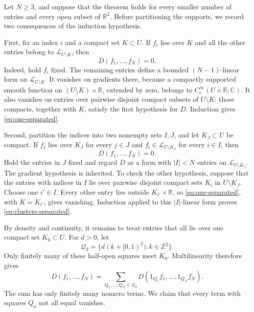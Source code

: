 \documentclass[11pt,letterpaper,reqno]{amsart}
\theoremstyle{definition}
\theoremstyle{remark}
\newcommand{\R}{\mathbb R}
\newcommand{\C}{\mathbb C}
\begin{document}
Let $N\ge3$, and suppose that the theorem holds for every smaller number
of entries and every open subset of $\R^2$. Before partitioning the
supports, we record two consequences of the induction hypothesis.

First, fix an index $i$ and a compact set $K\subset U$. If $f_i$ lies over
$K$ and all the other entries belong to $\mathcal L_{U\setminus K}$,
then
\begin{equation}\label{eq:one-separated}
 D(f_1,\ldots,f_N)=0.
\end{equation}
Indeed, hold $f_i$ fixed. The remaining entries define a bounded
$(N-1)$-linear form on $\mathcal L_{U\setminus K}$. It vanishes on
gradients there, because a compactly supported smooth function on
$(U\setminus K)\times\R$, extended by zero, belongs to
$C_c^\infty(U\times\R;\C)$.
It also vanishes on entries over pairwise disjoint compact subsets of
$U\setminus K$: those compacts, together with $K$, satisfy the first
hypothesis for $D$. Induction gives \eqref{eq:one-separated}.

Second, partition the indices into two nonempty sets $I,J$, and let
$K_J\subset U$ be compact. If $f_j$ lies over $K_J$ for every $j\in J$
and $f_i\in\mathcal L_{U\setminus K_J}$ for every $i\in I$, then
\begin{equation}\label{eq:clusters-separated}
 D(f_1,\ldots,f_N)=0.
\end{equation}
Hold the entries in $J$ fixed and regard $D$ as a form with $|I|<N$
entries on $\mathcal L_{U\setminus K_J}$. The gradient hypothesis is
inherited. To check the other hypothesis, suppose that the entries with
indices in $I$ lie over pairwise disjoint compact sets $K_i$ in
$U\setminus K_J$. Choose one $i'\in I$. Every other entry lies outside
$K_{i'}\times\R$, so \eqref{eq:one-separated}, with $K=K_{i'}$, gives
vanishing. Induction applied to this $|I|$-linear form proves
\eqref{eq:clusters-separated}.

By density and continuity, it remains to treat entries that all lie over
one compact set $K_0\subset U$. For $d>0$, let
\[
 \mathcal Q_d=\{d(k+[0,1)^2):k\in\mathbb Z^2\}.
\]
Only finitely many of these half-open squares meet $K_0$. Multilinearity
therefore gives
\begin{equation}\label{eq:partition}
 D(f_1,\ldots,f_N)=
 \sum_{Q_1,\ldots,Q_N\in\mathcal Q_d}
 D(1_{Q_1}f_1,\ldots,1_{Q_N}f_N).
\end{equation}
The sum has only finitely many nonzero terms. We claim that every term
with squares $Q_a$ not all equal vanishes.
\end{document}

